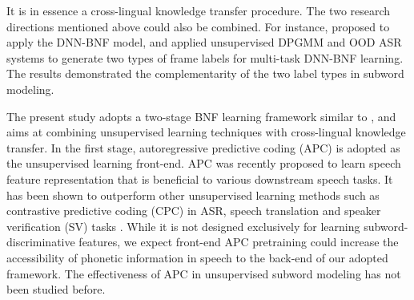 \documentclass[a4paper]{article}
\begin{document}
{\color{blue}
It is in essence a cross-lingual knowledge transfer procedure.}
The two research directions mentioned above could also be combined.
For instance, \cite{feng2019_TASLP} proposed to 
{\color{blue}
apply the DNN-BNF model, and  applied  unsupervised   DPGMM  and OOD ASR systems  to  generate two types of frame labels for multi-task DNN-BNF learning. 
The results  demonstrated the complementarity of the two label types in  subword modeling.
}

{\color{blue}The present study  adopts a two-stage BNF learning framework similar to  \cite{Feng2019improving}, and aims at}
combining unsupervised   learning techniques with  cross-lingual   knowledge transfer. 
In the first stage, autoregressive predictive coding (APC) is adopted as the unsupervised learning front-end.
APC was recently proposed \cite{Chung2019} to  learn speech feature representation that is beneficial to   various downstream speech tasks.
It has been shown to outperform other  unsupervised learning methods such as contrastive predictive coding (CPC) \cite{oord2018cpc} 
in ASR, speech translation and speaker verification (SV)  tasks \cite{Chung2019generative}.
While it is not designed exclusively for learning subword-discriminative features, we expect  front-end APC pretraining
could increase the accessibility of phonetic information in speech  to the  back-end of our adopted framework.
The effectiveness of APC in unsupervised subword modeling has not been studied before.
\end{document}
